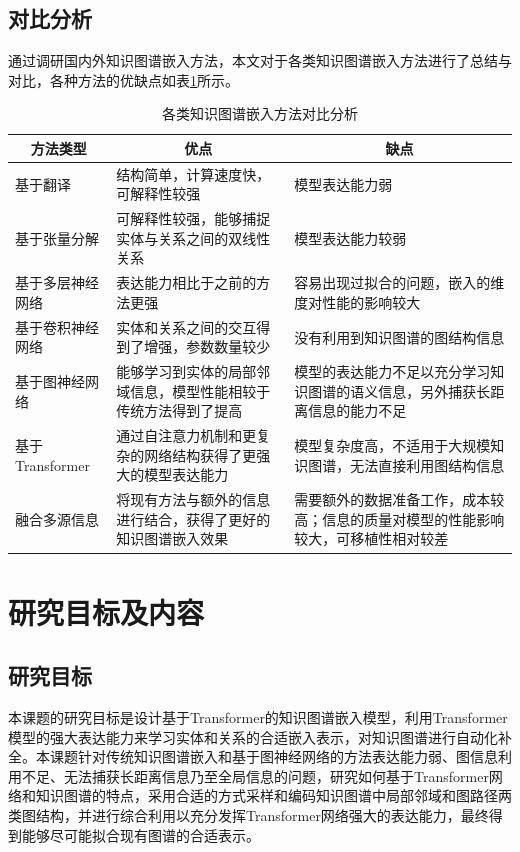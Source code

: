 \subsection{对比分析}
通过调研国内外知识图谱嵌入方法，本文对于各类知识图谱嵌入方法进行了总结与对比，各种方法的优缺点如表\ref{ComparativeAnalysis}所示。
\begin{table}[htbp]
  \renewcommand\arraystretch{1.5}
  \caption{各类知识图谱嵌入方法对比分析}
  \label{ComparativeAnalysis}
  \centering
  
  \begin{tabular}{lp{6cm}p{5cm}}
    \toprule
    \multicolumn{1}{c}{方法类型} & \multicolumn{1}{c}{优点} & \multicolumn{1}{c}{缺点}\\
    \midrule
    基于翻译 & 结构简单，计算速度快，可解释性较强& 模型表达能力弱\\
    基于张量分解 & 可解释性较强，能够捕捉实体与关系之间的双线性关系 & 模型表达能力较弱\\
    基于多层神经网络 & 表达能力相比于之前的方法更强 & 容易出现过拟合的问题，嵌入的维度对性能的影响较大\\
    基于卷积神经网络 & 实体和关系之间的交互得到了增强，参数数量较少&没有利用到知识图谱的图结构信息\\
    基于图神经网络 & 能够学习到实体的局部邻域信息，模型性能相较于传统方法得到了提高 & 模型的表达能力不足以充分学习知识图谱的语义信息，另外捕获长距离信息的能力不足\\
    基于Transformer &通过自注意力机制和更复杂的网络结构获得了更强大的模型表达能力 & 模型复杂度高，不适用于大规模知识图谱，无法直接利用图结构信息\\
    融合多源信息 & 将现有方法与额外的信息进行结合，获得了更好的知识图谱嵌入效果 & 需要额外的数据准备工作，成本较高；信息的质量对模型的性能影响较大，可移植性相对较差\\
    \bottomrule
  \end{tabular}
\end{table}

\section{研究目标及内容}
\subsection{研究目标}
本课题的研究目标是设计基于Transformer的知识图谱嵌入模型，利用Transformer模型的强大表达能力来学习实体和关系的合适嵌入表示，对知识图谱进行自动化补全。本课题针对传统知识图谱嵌入和基于图神经网络的方法表达能力弱、图信息利用不足、无法捕获长距离信息乃至全局信息的问题，研究如何基于Transformer网络和知识图谱的特点，采用合适的方式采样和编码知识图谱中局部邻域和图路径两类图结构，并进行综合利用以充分发挥Transformer网络强大的表达能力，最终得到能够尽可能拟合现有图谱的合适表示。

